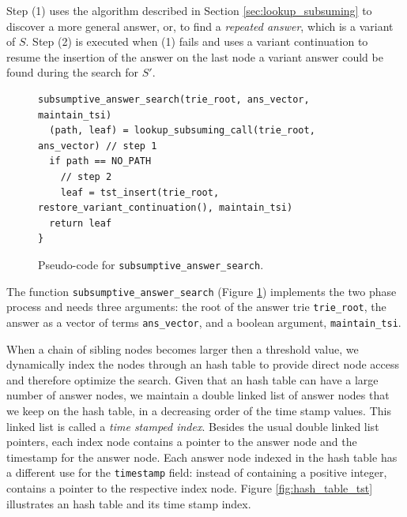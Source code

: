 Step (1) uses the algorithm described in Section \ref{sec:lookup_subsuming} to discover a more general answer, or,
to find a \textit{repeated answer}, which is a variant of $S$.
Step (2) is executed when (1) fails and uses a variant continuation to resume the insertion of the answer
on the last node a variant answer could be found during the search for $S'$.

\begin{figure}[ht]
\begin{Verbatim}[fontsize=\small]
subsumptive_answer_search(trie_root, ans_vector, maintain_tsi)
  (path, leaf) = lookup_subsuming_call(trie_root, ans_vector) // step 1
  if path == NO_PATH
    // step 2
    leaf = tst_insert(trie_root, restore_variant_continuation(), maintain_tsi)
  return leaf
}
\end{Verbatim}
\caption{Pseudo-code for \texttt{subsumptive\_answer\_search}.}
\label{fig:subsumptive_answer_search}
\end{figure}

The function \texttt{subsumptive\_answer\_search} (Figure \ref{fig:subsumptive_answer_search})
implements the two phase process and needs three arguments: the root of the answer trie \texttt{trie\_root},
the answer as a vector of terms \texttt{ans\_vector}, and a boolean argument, \texttt{maintain\_tsi}.

When a chain of sibling nodes becomes larger then a threshold value, we dynamically index the nodes through an hash table to provide direct node access and therefore optimize the search. Given that an hash table
can have a large number of answer nodes, we maintain a double linked list of answer nodes that we keep on the hash
table, in a decreasing order of the time stamp values. This linked list is called a \textit{time stamped index}.
Besides the usual double linked list pointers, each index node contains a pointer to the answer node
and the timestamp for the answer node. Each answer node indexed in the hash table has a different use
for the \texttt{timestamp} field: instead of containing a positive integer, contains a pointer to the respective index node. Figure \ref{fig:hash_table_tst} illustrates an hash table and its time stamp index.

